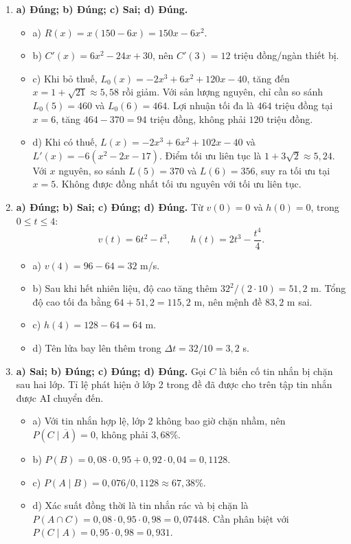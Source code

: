 \documentclass[12pt,a4paper]{article}
\begin{document}
\begin{enumerate}[label=\textbf{Câu \arabic*:}, leftmargin=*]
\item \textbf{a) Đúng; b) Đúng; c) Sai; d) Đúng.}
\begin{itemize}[leftmargin=*]
\item a) $R(x)=x(150-6x)=150x-6x^2$.
\item b) $C'(x)=6x^2-24x+30$, nên $C'(3)=12$ triệu đồng/ngàn thiết bị.
\item c) Khi bỏ thuế, $L_0(x)=-2x^3+6x^2+120x-40$, tăng đến $x=1+\sqrt{21}\approx5{,}58$ rồi giảm. Với sản lượng nguyên, chỉ cần so sánh $L_0(5)=460$ và $L_0(6)=464$. Lợi nhuận tối đa là $464$ triệu đồng tại $x=6$, tăng $464-370=94$ triệu đồng, không phải $120$ triệu đồng.
\item d) Khi có thuế, $L(x)=-2x^3+6x^2+102x-40$ và $L'(x)=-6(x^2-2x-17)$. Điểm tối ưu liên tục là $1+3\sqrt2\approx5{,}24$. Với $x$ nguyên, so sánh $L(5)=370$ và $L(6)=356$, suy ra tối ưu tại $x=5$. Không được đồng nhất tối ưu nguyên với tối ưu liên tục.
\end{itemize}
\item \textbf{a) Đúng; b) Sai; c) Đúng; d) Đúng.}
Từ $v(0)=0$ và $h(0)=0$, trong $0\le t\le4$:
\[
v(t)=6t^2-t^3,\qquad h(t)=2t^3-\frac{t^4}{4}.
\]
\begin{itemize}[leftmargin=*]
\item a) $v(4)=96-64=32$ m/s.
\item b) Sau khi hết nhiên liệu, độ cao tăng thêm $32^2/(2\cdot10)=51{,}2$ m. Tổng độ cao tối đa bằng $64+51{,}2=115{,}2$ m, nên mệnh đề $83{,}2$ m sai.
\item c) $h(4)=128-64=64$ m.
\item d) Tên lửa bay lên thêm trong $\Delta t=32/10=3{,}2$ s.
\end{itemize}
\item \textbf{a) Sai; b) Đúng; c) Đúng; d) Đúng.}
Gọi $C$ là biến cố tin nhắn bị chặn sau hai lớp. Tỉ lệ phát hiện ở lớp 2 trong đề đã được cho trên tập tin nhắn được AI chuyển đến.
\begin{itemize}[leftmargin=*]
\item a) Với tin nhắn hợp lệ, lớp 2 không bao giờ chặn nhầm, nên $P(C\mid\overline A)=0$, không phải $3{,}68\%$.
\item b) $P(B)=0{,}08\cdot0{,}95+0{,}92\cdot0{,}04=0{,}1128$.
\item c) $P(A\mid B)=0{,}076/0{,}1128\approx67{,}38\%$.
\item d) Xác suất đồng thời là tin nhắn rác và bị chặn là $P(A\cap C)=0{,}08\cdot0{,}95\cdot0{,}98=0{,}07448$. Cần phân biệt với $P(C\mid A)=0{,}95\cdot0{,}98=0{,}931$.

\end{itemize}
\end{enumerate}
\end{document}
